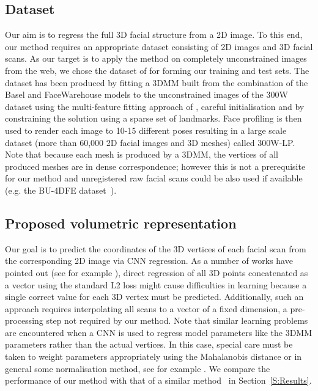 \subsection{Dataset}

Our aim is to regress the full 3D facial structure from a 2D image. To
this end, our method requires an appropriate dataset consisting of 2D
images and 3D facial scans. As our target is to apply the method on
completely unconstrained images from the web, we chose the dataset of
\cite{zhu2016face} for forming our training and test sets. The dataset
has been produced by fitting a 3DMM built from the combination of the
Basel \cite{paysan20093d} and FaceWarehouse
\cite{cao2014facewarehouse} models to the unconstrained images of the
300W dataset \cite{sagonas2013semi} using the multi-feature fitting
approach of \cite{romdhani2005estimating}, careful initialisation and
by constraining the solution using a sparse set of landmarks. Face
profiling is then used to render each image to 10-15 different poses
resulting in a large scale dataset (more than 60,000 2D facial images
and 3D meshes) called 300W-LP. Note that because each mesh is
produced by a 3DMM, the vertices of all produced meshes are in dense
correspondence; however this is not a prerequisite for our method and
unregistered raw facial scans could be also used if available
(e.g. the BU-4DFE dataset~\cite{yin2008high}).

\subsection{Proposed volumetric representation}

Our goal is to predict the coordinates of the 3D vertices of each
facial scan from the corresponding 2D image via CNN regression. As a
number of works have pointed out (see for example
\cite{tompson2015efficient, pfister2015flowing}), direct regression of
all 3D points concatenated as a vector using the standard L2 loss
might cause difficulties in learning because a single correct value
for each 3D vertex must be predicted. Additionally, such an approach
requires interpolating all scans to a vector of a fixed dimension, a
pre-processing step not required by our method. Note that similar
learning problems are encountered when a CNN is used to regress model
parameters like the 3DMM parameters rather than the actual
vertices. In this case, special care must be taken to weight parameters
appropriately using the Mahalanobis distance or in general some
normalisation method, see for example \cite{zhu2016face}. We compare
the performance of our method with that of a similar method~\cite{zhu2016face} in Section~\ref{S:Results}.

